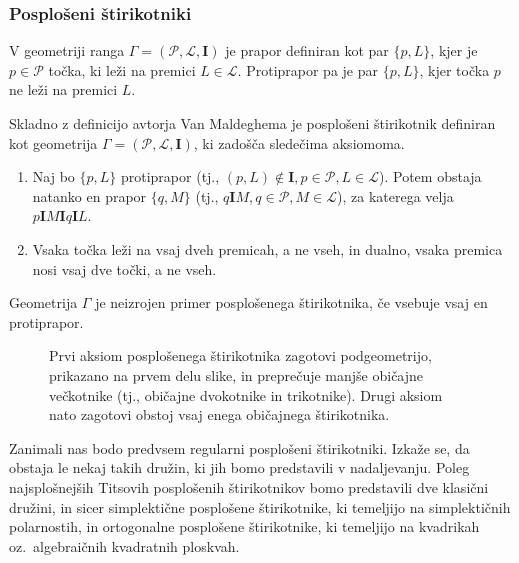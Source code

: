 \documentclass[fin1, tisk]{fmfdelo}
\newcommand{\II}{\mathbf{I}}
\newcommand{\PP}{\mathcal{P}}
\newcommand{\LL}{\mathcal{L}}
\begin{document}
\subsubsection{Posplošeni štirikotniki}

\begin{definicija}
    V geometriji ranga $\Gamma = (\PP, \LL, \II)$ je prapor definiran kot par $\{p, L\}$, kjer je $p\in\PP$ točka, 
    ki leži na premici $L\in\LL$. Protiprapor pa je par $\{p, L\}$, kjer točka $p$ ne leži na premici $L$.
\end{definicija}

\begin{definicija}\label{def:posploseni_stirikotnik}
    Skladno z definicijo avtorja Van Maldeghema \cite{van2012generalized} je posplošeni %
    štirikotnik definiran kot geometrija $\Gamma = (\PP, \LL, \II)$, ki zadošča sledečima aksiomoma.
    \begin{enumerate}[label=(\roman*)]
        \item Naj bo $\{p, L\}$ protiprapor (tj., $(p,L)\not\in\II, p\in\PP, L\in\LL$). 
        Potem obstaja natanko en prapor $\{q, M\}$ (tj., $q \II M, q\in\PP, M\in\LL$),
        za katerega velja $p \II M \II q \II L$.\label{it:ss1}
        \item Vsaka točka leži na vsaj dveh premicah, a ne vseh, in dualno, vsaka premica
        nosi vsaj dve točki, a ne vseh.\label{it:ss2}
    \end{enumerate}
    Geometrija $\Gamma$ je neizrojen primer posplošenega štirikotnika, če vsebuje vsaj en protiprapor.
\end{definicija}

\begin{figure}[ht]
    \centering
    \def\svgwidth{\columnwidth}
    \caption{Prvi aksiom posplošenega štirikotnika zagotovi podgeometrijo, prikazano na prvem delu slike, in preprečuje manjše
    običajne večkotnike (tj., običajne dvokotnike in trikotnike). Drugi aksiom 
    nato zagotovi obstoj vsaj enega običajnega štirikotnika.}
    \label{fig:stirikotnik_aksiomi}
\end{figure}

Zanimali nas bodo predvsem regularni posplošeni štirikotniki. Izkaže se,
da obstaja le nekaj takih družin, ki jih bomo predstavili v nadaljevanju. Poleg naj\-sploš\-nej\-ših Titsovih posplošenih štirikotnikov bomo 
predstavili 
dve klasični družini, in sicer
simplektične posplošene štirikotnike, ki temeljijo na simplektičnih polarnostih, in 
ortogonalne posplošene štirikotnike, ki temeljijo na kvadrikah oz.~algebraičnih kvadratnih ploskvah.
\end{document}
